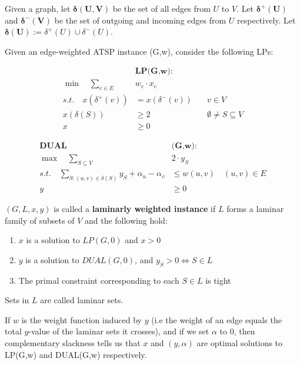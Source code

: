 \documentclass[./main.tex]{subfiles}
\begin{document}
\begin{definition} Given a graph, let $\bm{\delta(U,V)}$ be the set of all edges from $U$ to $V$. Let $\bm{\delta^+(U)}$ and $\bm{\delta^-(V)}$ be the set of outgoing and incoming edges from $U$ respectively. Let $\bm{\delta(U)}:=\delta^+(U)\cup \delta^-(U)$.\end{definition}\vspace{4mm}
\begin{definition} Given an edge-weighted ATSP instance (G,w), consider the following LPs:
\end{definition}
\begin{minipage}{0.20\textwidth}
\begin{align*}
&\textbf{LP(G,w):}\\
\min\quad\sum_{e\in E}&w_e\cdot x_e\\
s.t.\quad x(\delta^+(v)) &= x(\delta^-(v))\quad &v\in V\\
x(\delta(S)) &\geq 2\quad &\emptyset\neq S\subseteq V\\
x&\geq 0
\end{align*}
\end{minipage}
\hfill\vline\hfill
\begin{minipage}{0.55\textwidth}
\begin{align*}
\textbf{DUAL}&\textbf{(G,w):}\\
\max\quad\sum_{S\subseteq V}&2\cdot y_S\\
s.t.\quad\sum_{S:(u,v)\in \delta(S)}y_S + \alpha_u - \alpha_v&\leq w(u,v)\quad (u,v)\in E\\
y&\geq 0
\end{align*}
\end{minipage}
\vspace{7mm}
\begin{definition} $(G,L,x,y)$ is called a \textbf{laminarly weighted instance} if $L$ forms a laminar family of subsets of $V$ and the following hold:
\begin{enumerate}
\item $x$ is a solution to $LP(G,0)$ and $x > 0$
\item $y$ is a solution to $DUAL(G,0)$, and $y_S>0\iff S\in L$
\item The primal constraint corresponding to each $S\in L$ is tight
\end{enumerate}
Sets in $L$ are called laminar sets.
\end{definition}\vspace{4mm}
If $w$ is the weight function induced by $y$ (i.e the weight of an edge equals the total $y$-value of the laminar sets it crosses), and if we set $\alpha$ to $0$, then complementary slackness tells us that $x$ and $(y,\alpha)$ are optimal solutions to LP(G,w) and DUAL(G,w) respectively.\vspace{4mm}
\end{document}
